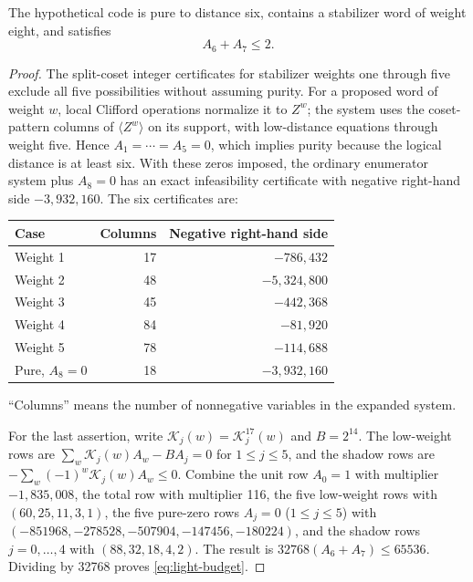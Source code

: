 \begin{proposition}\label{prop:17-enumerator}
The hypothetical code is pure to distance six, contains a stabilizer word
of weight eight, and satisfies
\begin{equation}\label{eq:light-budget}
 A_6+A_7\leq2.
\end{equation}
\end{proposition}
\begin{proof}
The split-coset integer certificates for stabilizer weights one through
five exclude all five possibilities without assuming purity.
For a proposed word of weight \(w\), local Clifford operations normalize
it to \(Z^w\); the system uses the coset-pattern columns of
\(\langle Z^w\rangle\) on its support, with low-distance equations
through weight five. Hence \(A_1=\cdots=A_5=0\), which implies purity
because the logical distance is at least six. With these zeros imposed,
the ordinary enumerator system plus \(A_8=0\) has an exact infeasibility
certificate with negative right-hand side \(-3,932,160\). The six
certificates are:
\begin{center}\small
\begin{tabular}{@{}lrr@{}}\toprule
Case&Columns&Negative right-hand side\\\midrule
Weight 1&17&\(-786,432\)\\
Weight 2&48&\(-5,324,800\)\\
Weight 3&45&\(-442,368\)\\
Weight 4&84&\(-81,920\)\\
Weight 5&78&\(-114,688\)\\
Pure, \(A_8=0\)&18&\(-3,932,160\)\\\bottomrule
\end{tabular}
\end{center}
``Columns'' means the number of nonnegative variables in the expanded
system.

For the last assertion, write \(\mathcal{K}_j(w)=\mathcal{K}_j^{17}(w)\)
and \(B=2^{14}\). The low-weight rows are
\(\sum_w \mathcal{K}_j(w)A_w-BA_j=0\) for \(1\leq j\leq5\), and the
shadow rows are \(-\sum_w(-1)^w\mathcal{K}_j(w)A_w\leq0\).
Combine the unit row \(A_0=1\) with multiplier \(-1,835,008\),
the total row with multiplier 116, the five low-weight rows with
\((60,25,11,3,1)\), the five pure-zero rows \(A_j=0\)
(\(1\leq j\leq5\)) with
\((-851968,-278528,-507904,-147456,-180224)\), and the shadow rows
\(j=0,\ldots,4\) with \((88,32,18,4,2)\).
The result is
\(32768(A_6+A_7)\leq65536\). Dividing by 32768 proves
\eqref{eq:light-budget}.
\end{proof}

